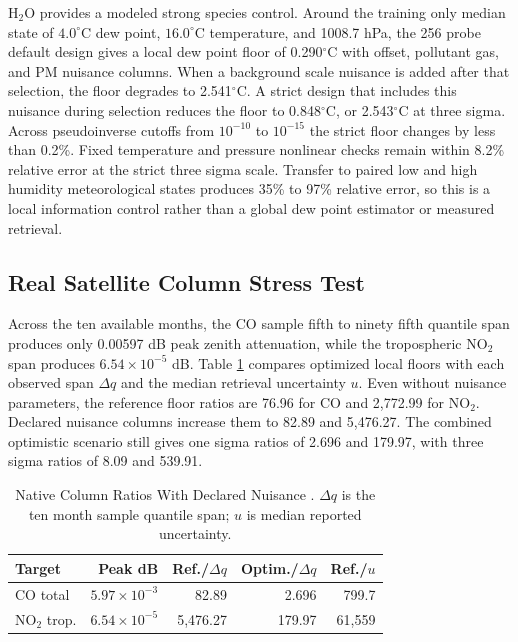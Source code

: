 \documentclass[conference]{IEEEtran}
\begin{document}
H$_2$O provides a modeled strong species control. Around the training only median state of $4.0^\circ$C dew point, $16.0^\circ$C temperature, and 1008.7 hPa, the 256 probe default design gives a local dew point floor of 0.290$^\circ$C with offset, pollutant gas, and PM nuisance columns. When a background scale nuisance is added after that selection, the floor degrades to 2.541$^\circ$C. A strict design that includes this nuisance during selection reduces the floor to 0.848$^\circ$C, or 2.543$^\circ$C at three sigma. Across pseudoinverse cutoffs from $10^{-10}$ to $10^{-15}$ the strict floor changes by less than 0.2\%. Fixed temperature and pressure nonlinear checks remain within 8.2\% relative error at the strict three sigma scale. Transfer to paired low and high humidity meteorological states produces 35\% to 97\% relative error, so this is a local information control rather than a global dew point estimator or measured retrieval.

\subsection{Real Satellite Column Stress Test}

Across the ten available months, the CO sample fifth to ninety fifth quantile span produces only 0.00597 dB peak zenith attenuation, while the tropospheric NO$_2$ span produces $6.54\times10^{-5}$ dB. Table \ref{tab:columns} compares optimized local floors with each observed span $\Delta q$ and the median retrieval uncertainty $u$. Even without nuisance parameters, the reference floor ratios are 76.96 for CO and 2,772.99 for NO$_2$. Declared nuisance columns increase them to 82.89 and 5,476.27. The combined optimistic scenario still gives one sigma ratios of 2.696 and 179.97, with three sigma ratios of 8.09 and 539.91.

\begin{table}[t]
\caption{Native Column Ratios With Declared Nuisance \cite{esacciCO,esacciNO2}. $\Delta q$ is the ten month sample quantile span; $u$ is median reported uncertainty.}
\label{tab:columns}
\centering
\scriptsize
\setlength{\tabcolsep}{1.5pt}
\begin{tabular}{@{}lrrrr@{}}
\toprule
Target & Peak dB & Ref./$\Delta q$ & Optim./$\Delta q$ & Ref./$u$ \\
\midrule
CO total & $5.97\!\times\!10^{-3}$ & 82.89 & 2.696 & 799.7 \\
NO$_2$ trop. & $6.54\!\times\!10^{-5}$ & 5,476.27 & 179.97 & 61,559 \\
\bottomrule
\end{tabular}
\end{table}
\end{document}
